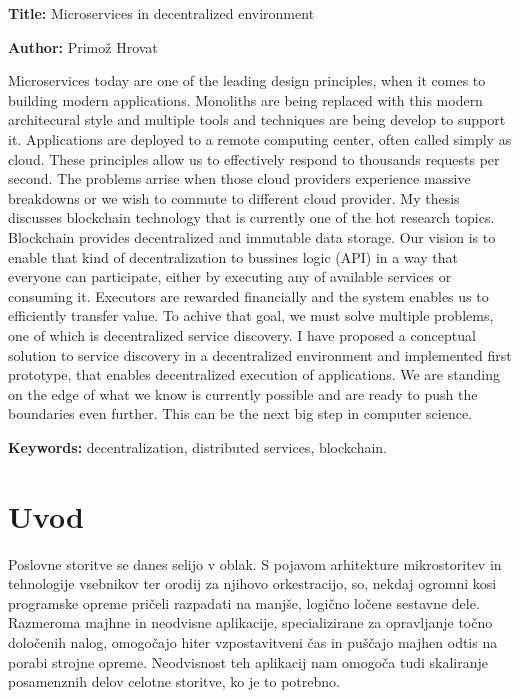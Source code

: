 \documentclass[a4paper, 12pt]{book}
\newcommand{\ttitleEn}{Microservices in decentralized environment}
\newcommand{\tauthor}{Primož Hrovat}
\newcommand{\tkeywordsEn}{decentralization, distributed services, blockchain}
\newcommand{\clearemptydoublepage}{\newpage{\pagestyle{empty}\cleardoublepage}}
\begin{document}
\noindent\textbf{Title:} \ttitleEn
\bigskip

\noindent\textbf{Author:} \tauthor
\bigskip

\noindent 

Microservices today are one of the leading design principles, when it comes to building modern applications.
Monoliths are being replaced with this modern architecural style and multiple tools and techniques are being develop to support it.
Applications are deployed to a remote computing center, often called simply as cloud.
These principles allow us to effectively respond to thousands requests per second.
The problems arrise when those cloud providers experience massive breakdowns or we wish to commute to different cloud provider.
My thesis discusses blockchain technology that is currently one of the hot research topics.
Blockchain provides decentralized and immutable data storage.
Our vision is to enable that kind of decentralization to bussines logic (API) in a way that everyone can participate, either by executing any of available services or consuming it.
Executors are rewarded financially and the system enables us to efficiently transfer value.
To achive that goal, we must solve multiple problems, one of which is decentralized service discovery.
I have proposed a conceptual solution to service discovery in a decentralized environment and implemented first prototype, that enables decentralized execution of applications.
We are standing on the edge of what we know is currently possible and are ready to push the boundaries even further. This can be the next big step in computer science.

\bigskip

\noindent\textbf{Keywords:} \tkeywordsEn.
\clearemptydoublepage

\mainmatter
\setcounter{page}{1}
\pagestyle{fancy}

\chapter{Uvod}
Poslovne storitve se danes selijo v oblak.
S pojavom arhitekture mikrostoritev in tehnologije vsebnikov ter orodij za njihovo orkestracijo, so, nekdaj ogromni kosi programske opreme pričeli razpadati na manjše, logično ločene sestavne dele.
Razmeroma majhne in neodvisne aplikacije, specializirane za opravljanje točno določenih nalog, omogočajo hiter vzpostavitveni čas in puščajo majhen odtis na porabi strojne opreme.
Neodvisnost teh aplikacij nam omogoča tudi skaliranje posamenznih delov celotne storitve, ko je to potrebno.
\end{document}
